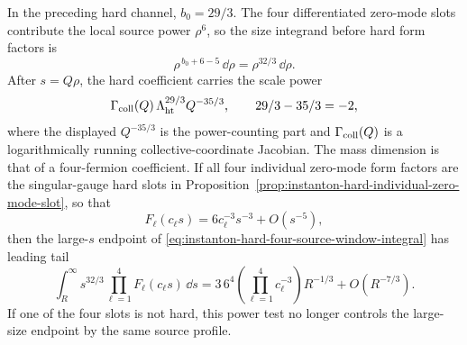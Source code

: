 \begin{proposition}[\(SU(3)\), \(N_f=2\) hard-source power and slow tail]
\label{prop:su3-nf2-hard-source-power-slow-tail}
In the preceding hard channel, \(b_0=29/3\).  The four differentiated
zero-mode slots contribute the local source power \(\rho^6\), so the size
integrand before hard form factors is
\begin{equation}
  \rho^{\,b_0+6-5}\,\dd\rho
  =
  \rho^{32/3}\,\dd\rho .
  \label{eq:instanton-hard-four-source-rho-power}
\end{equation}
After \(s=Q\rho\), the hard coefficient carries the scale power
\begin{equation}
  \Gamma_{\rm coll}(Q)\,
  \Lambda_{\rm ht}^{29/3}Q^{-35/3},
  \qquad
  29/3-35/3=-2 ,
  \label{eq:instanton-hard-four-source-scale-power}
\end{equation}
where the displayed \(Q^{-35/3}\) is the power-counting part and
\(\Gamma_{\rm coll}(Q)\) is a logarithmically running collective-coordinate
Jacobian.  The mass dimension is that of a four-fermion coefficient.  If all
four individual zero-mode form factors are the singular-gauge hard slots in
Proposition~\ref{prop:instanton-hard-individual-zero-mode-slot}, so that
\[
  F_\ell(c_\ell s)=6c_\ell^{-3}s^{-3}+O(s^{-5}),
\]
then the large-\(s\) endpoint of \eqref{eq:instanton-hard-four-source-window-integral}
has leading tail
\begin{equation}
  \int_R^\infty
  s^{32/3}\prod_{\ell=1}^{4}F_\ell(c_\ell s)\,\dd s
  =
  3\,6^4\!\left(\prod_{\ell=1}^{4}c_\ell^{-3}\right)R^{-1/3}
  +O(R^{-7/3}).
  \label{eq:instanton-hard-four-source-slow-tail}
\end{equation}
If one of the four slots is not hard, this power test no longer controls the
large-size endpoint by the same source profile.
\end{proposition}

